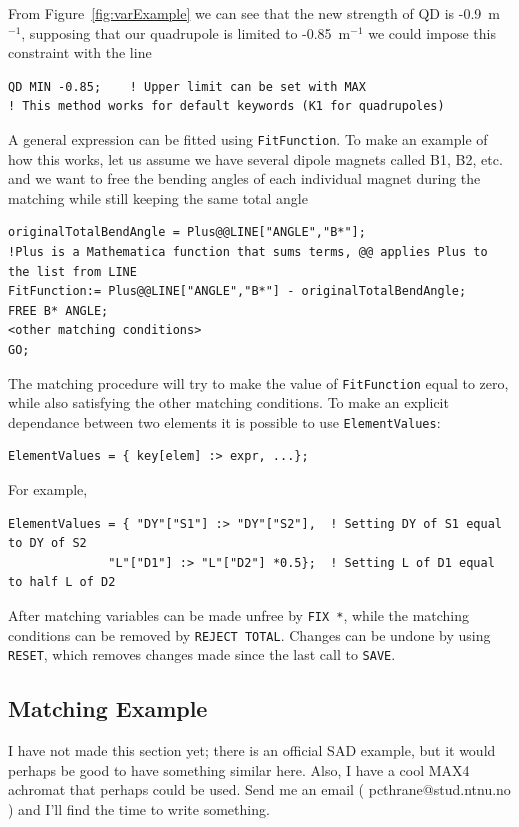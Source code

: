 \documentclass{article}
\begin{document}
From Figure~\ref{fig:varExample} we can see that the new strength of QD is -0.9~m$^{-1}$, supposing that our quadrupole is limited to -0.85~m$^{-1}$ we could impose this constraint with the line
\begin{lstlisting}
QD MIN -0.85;    ! Upper limit can be set with MAX
! This method works for default keywords (K1 for quadrupoles)
\end{lstlisting}

A general expression can be fitted using \texttt{FitFunction}. To make an example of how this works, let us assume we have several dipole magnets called B1, B2, etc. and we want to free the bending angles of each individual magnet during the matching while still keeping the same total angle 
\begin{lstlisting}
originalTotalBendAngle = Plus@@LINE["ANGLE","B*"];
!Plus is a Mathematica function that sums terms, @@ applies Plus to the list from LINE
FitFunction:= Plus@@LINE["ANGLE","B*"] - originalTotalBendAngle;
FREE B* ANGLE;
<other matching conditions>
GO;
\end{lstlisting}
The matching procedure will try to make the value of \texttt{FitFunction} equal to zero, while also satisfying the other matching conditions.
To make an explicit dependance between two elements it is possible to use \texttt{ElementValues}:
\begin{lstlisting}
ElementValues = { key[elem] :> expr, ...};
\end{lstlisting}
For example,
\begin{lstlisting}
ElementValues = { "DY"["S1"] :> "DY"["S2"],  ! Setting DY of S1 equal to DY of S2
              "L"["D1"] :> "L"["D2"] *0.5};  ! Setting L of D1 equal to half L of D2
\end{lstlisting}
After matching variables can be made unfree by \texttt{FIX *}, while the matching conditions can be removed by \texttt{REJECT TOTAL}. Changes can be undone by using \texttt{RESET}, which removes changes made since the last call to \texttt{SAVE}.

\subsection{Matching Example}
I have not made this section yet; there is an official SAD example, but it would perhaps be good to have something similar here. Also, I have a cool MAX4 achromat that perhaps could be used. Send me an email ( pcthrane@stud.ntnu.no ) and I'll find the time to write something.
\end{document}
